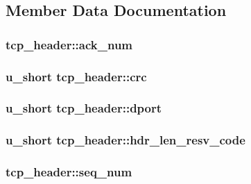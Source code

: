 \subsection{\-Member \-Data \-Documentation}
\hypertarget{structtcp__header_ae452d7741f9b70695a797e2bb2608479}{
\subsubsection[{ack\-\_\-num}]{ {\bf tcp\-\_\-header\-::ack\-\_\-num}}}\label{structtcp__header_ae452d7741f9b70695a797e2bb2608479}
\hypertarget{structtcp__header_ac0b5df1d697bf90d8286b889609daca0}{
\subsubsection[{crc}]{\setlength{\rightskip}{0pt plus 5cm}u\-\_\-short {\bf tcp\-\_\-header\-::crc}}}\label{structtcp__header_ac0b5df1d697bf90d8286b889609daca0}
\hypertarget{structtcp__header_afad92b412e085a6237a98f7dcd0e1744}{
\subsubsection[{dport}]{\setlength{\rightskip}{0pt plus 5cm}u\-\_\-short {\bf tcp\-\_\-header\-::dport}}}\label{structtcp__header_afad92b412e085a6237a98f7dcd0e1744}
\hypertarget{structtcp__header_a957cd867a63215d329c43eb6a1cfbd4a}{
\subsubsection[{hdr\-\_\-len\-\_\-resv\-\_\-code}]{\setlength{\rightskip}{0pt plus 5cm}u\-\_\-short {\bf tcp\-\_\-header\-::hdr\-\_\-len\-\_\-resv\-\_\-code}}}\label{structtcp__header_a957cd867a63215d329c43eb6a1cfbd4a}
\hypertarget{structtcp__header_ae16e608ea5df1f84820820972c04f45e}{
\subsubsection[{seq\-\_\-num}]{ {\bf tcp\-\_\-header\-::seq\-\_\-num}}}\label{structtcp__header_ae16e608ea5df1f84820820972c04f45e}
